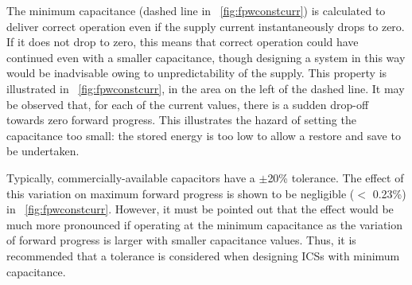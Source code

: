 The minimum capacitance (dashed line in \figurename{~\ref{fig:fpwconstcurr}}) is calculated to deliver correct operation even if the supply current instantaneously drops to zero. If it does not drop to zero, this means that correct operation could have continued even with a smaller capacitance, though designing a system in this way would be inadvisable owing to unpredictability of the supply. This property is illustrated in \figurename{~\ref{fig:fpwconstcurr}}, in the area on the left of the dashed line. It may be observed that, for each of the current values, there is a sudden drop-off towards zero forward progress. This illustrates the hazard of setting the capacitance too small: the stored energy is too low to allow a restore and save to be undertaken.
 
Typically, commercially-available capacitors have a $\pm$20\% tolerance. The effect of this variation on maximum forward progress is shown to be negligible ($<$ 0.23\%) in \figurename{~\ref{fig:fpwconstcurr}}. However, it must be pointed out that the effect would be much more pronounced if operating at the minimum capacitance as the variation of forward progress is larger with smaller capacitance values. Thus, it is recommended that a tolerance is considered when designing ICSs with minimum capacitance.



